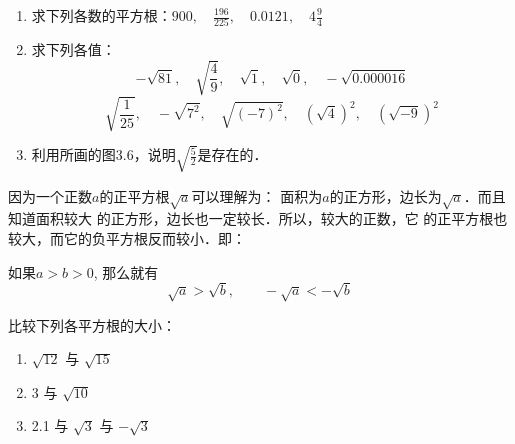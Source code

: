 \begin{ex}
\begin{enumerate}
    \item 求下列各数的平方根：$900,\quad 
    \frac{196}{225},\quad 0.0121,\quad 4\frac{9}{4}$

\item 求下列各值：
\[-\sqrt{81},\quad \sqrt{\frac{4}{9}},\quad \sqrt{1},\quad \sqrt{0},\quad -\sqrt{0.000016}\]
\[\sqrt{\frac{1}{25}},\quad -\sqrt{7^2},\quad \sqrt{(-7)^2},\quad \left(\sqrt{4}\right)^2,\quad \left(\sqrt{-9}\right)^2\]

\item 利用所画的图3.6，说明$\sqrt{\frac{5}{2}}$是存在的．
 \end{enumerate}
\end{ex}


\begin{figure}[htp]
    \centering
    \caption{}
\end{figure}

因为一个正数$a$的正平方根$\sqrt{a}$可以理解为：
面积为$a$的正方形，边长为$\sqrt{a}$．而且知道面积较大
的正方形，边长也一定较长．所以，较大的正数，它
的正平方根也较大，而它的负平方根反而较小．即：

\begin{blk}{}
    如果$a>b>0$, 那么就有
    $$\sqrt{a}>\sqrt{b},\qquad -\sqrt{a}<-\sqrt{b}$$
\end{blk}

 
\begin{example}
比较下列各平方根的大小：
\begin{enumerate}
    \item $\sqrt{12}$ 与 $\sqrt{15}$
    \item 3 与 $\sqrt{10}$
    \item 2.1 与 $\sqrt{3}$ 与 $-\sqrt{3}$
\end{enumerate}
\end{example}

